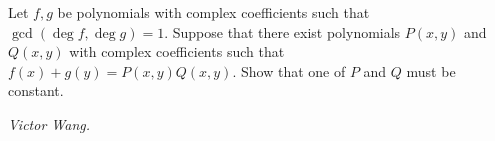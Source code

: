 Let $f,g$ be polynomials with complex coefficients such that $\gcd(\deg f,\deg g)=1$. Suppose that there exist polynomials $P(x,y)$ and $Q(x,y)$ with complex coefficients such that $f(x)+g(y)=P(x,y)Q(x,y)$. Show that one of $P$ and $Q$ must be constant.

\textit{Victor Wang.}